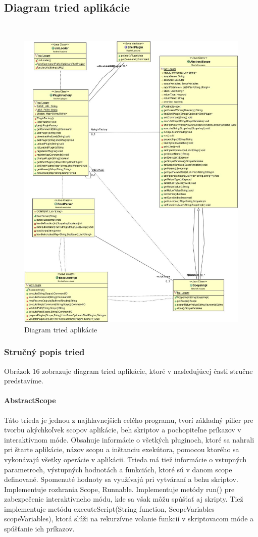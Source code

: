 \newpage
\subsection{Diagram tried aplikácie}
 \begin{figure}[!htbp]
	\centering
	\includegraphics[scale=0.4]{img/ClassApplication.jpg}
	\caption{Diagram tried aplikácie}
	\label{fig:test}
\end{figure}
\subsubsection{Stručný popis tried}
\indent Obrázok 16 zobrazuje diagram tried aplikácie, ktoré v nasledujúcej časti stručne predstavíme.
\paragraph{AbstractScope}
Táto trieda je jednou z najhlavnejších celého programu, tvorí základný pilier pre tvorbu akýchkoľvek scopov aplikácie, beh skriptov a pochopiteľne príkazov v interaktívnom móde. Obsahuje informácie o všetkých pluginoch, ktoré sa nahrali pri štarte aplikácie, názov scopu a inštanciu exekútora, pomocou ktorého sa vykonávajú všetky operácie v aplikácii. Trieda má tiež informácie o vstupných parametroch, výstupných hodnotách a funkciách, ktoré sú v danom scope definované. Spomenuté hodnoty sa využívajú pri vytváraní a behu skriptov. Implementuje rozhrania Scope, Runnable. Implementuje metódy run() pre zabezpečenie interaktívneho módu, kde sa však môžu spúšťať aj skripty. Tiež implementuje metódu executeScript(String function, ScopeVariables scopeVariables), ktorá slúži na rekurzívne volanie funkcií v skriptovacom móde a  spúšťanie ich príkazov.
